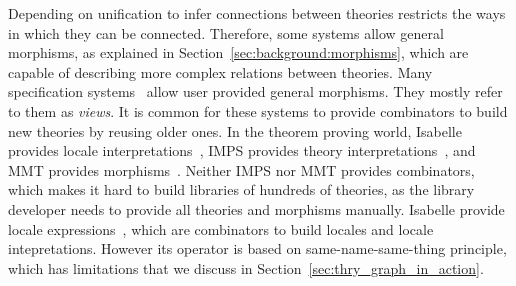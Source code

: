 Depending on unification to infer connections between theories restricts the ways in which they can be connected. 
Therefore, some systems allow general morphisms, as explained in Section~\ref{sec:background:morphisms}, which are capable of describing more complex relations between theories. Many specification systems~\cite{Goguen1980, CoFI:2004:CASL-RM, Smith99, duran2007maude} allow user provided general morphisms. They mostly refer to them as \emph{views}. It is common for these systems to provide combinators to build new theories by reusing older ones. In the theorem proving world, Isabelle provides locale interpretations~\cite{localeIntepretations2006}, IMPS provides theory interpretations~\cite{farmer1993imps}, and MMT provides morphisms~\cite{rabe2013scalable}. Neither IMPS nor MMT provides combinators, which makes it hard to build libraries of hundreds of theories, as the library developer needs to provide all theories and morphisms manually. Isabelle provide locale expressions~\cite{ballarin2003locales}, which are combinators to build locales and locale intepretations. However its  operator is based on same-name-same-thing principle, which has limitations that we discuss in Section~\ref{sec:thry_graph_in_action}. 





